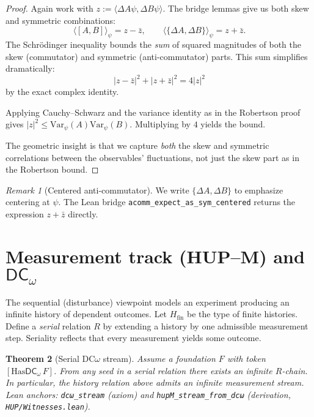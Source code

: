 \documentclass[11pt]{article}
\newcommand{\DCw}{\mathsf{DC}_{\omega}}
\newcommand{\lean}[1]{\texttt{#1}}
\newcommand{\leanok}{\text{\tiny [✓ Lean Verified]}}
\newcommand{\ip}[2]{\langle #1, #2 \rangle}
\newcommand{\E}[1]{\langle #1 \rangle}
\newcommand{\comm}[2]{[#1, #2]}
\newcommand{\acomm}[2]{\{#1, #2\}} %
\newcommand{\absC}[1]{\left| #1 \right|}
\newcommand{\abssq}[1]{\absC{#1}^{2}}
\newcommand{\Var}{\mathrm{Var}}
\theoremstyle{plain}
\newtheorem{theorem}{Theorem}[section]
\theoremstyle{definition}
\theoremstyle{remark}
\newtheorem{remark}[theorem]{Remark}
\begin{document}
\begin{proof}
Again work with $z := \ip{\Delta A\psi}{\Delta B\psi}$. The bridge lemmas give us both skew and symmetric combinations:
\[
\E{\comm{A}{B}}_\psi = z - \bar{z}, \qquad \E{\acomm{\Delta A}{\Delta B}}_\psi = z + \bar{z}.
\]
The Schrödinger inequality bounds the \emph{sum} of squared magnitudes of both the skew (commutator) and symmetric (anti-commutator) parts. This sum simplifies dramatically:
\[
\abssq{z - \bar{z}} + \abssq{z + \bar{z}} = 4\abssq{z}
\]
by the exact complex identity.

Applying Cauchy--Schwarz and the variance identity as in the Robertson proof gives $\abssq{z} \leq \Var_\psi(A)\Var_\psi(B)$. Multiplying by $4$ yields the bound.

The geometric insight is that we capture \emph{both} the skew and symmetric correlations between the observables' fluctuations, not just the skew part as in the Robertson bound.
\end{proof}

\begin{remark}[Centered anti-commutator]
We write $\acomm{\Delta A}{\Delta B}$ to emphasize centering at $\psi$.
The Lean bridge \lean{acomm\_expect\_as\_sym\_centered} returns the expression $z+\bar z$ directly.
\end{remark}

\section{Measurement track (HUP--M) and $\DCw$}
\label{sec:measurement-DC}

The sequential (disturbance) viewpoint models an experiment producing an infinite history of dependent outcomes.
Let $H_{\mathrm{fin}}$ be the type of finite histories. Define a \emph{serial} relation $R$ by extending a history by one admissible measurement step. Seriality reflects that every measurement yields some outcome.

\begin{theorem}[Serial DC$\omega$ stream]\leanok
\label{thm:dcomega}
Assume a foundation $F$ with token $[\mathrm{Has}\DCw\,F]$.
From any seed in a serial relation there exists an infinite $R$-chain. In particular, the history relation above admits an infinite measurement stream.
\emph{Lean anchors:} \lean{dcω\_stream} (axiom) and \lean{hupM\_stream\_from\_dcω} (derivation, \texttt{HUP/Witnesses.lean}).
\end{theorem}
\end{document}

